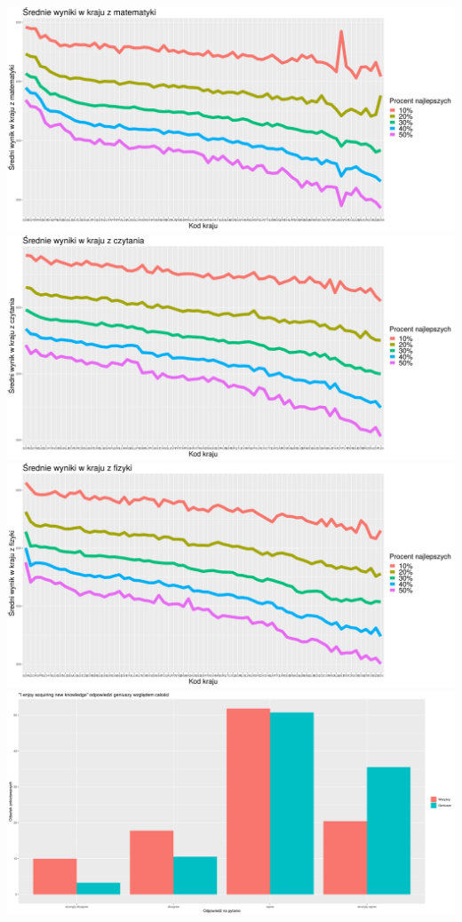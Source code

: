 \documentclass[]{article}
\begin{document}
\includegraphics[width=1\linewidth]{./Wykresiki/best_math}
\includegraphics[width=1\linewidth]{./Wykresiki/best_read}
\includegraphics[width=1\linewidth]{./Wykresiki/best_science}
\includegraphics[width=1\linewidth]{./wykresy_pytania_kwestionariusz/enjoy_new_knowledge_odsetek}
\end{document}
